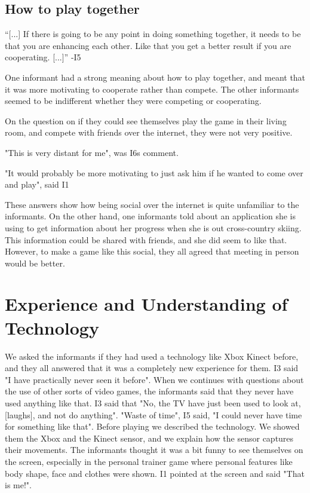 \subsection{How to play together}
“[...] If there is going to be any point in doing something together, it needs to be that you are enhancing each other. Like that you get a better result if you are cooperating. [...]” -I5

One informant had a strong meaning about how to play together, and meant that it was more motivating to cooperate rather than compete. The other informants seemed to be indifferent whether they were competing or cooperating.

On the question on if they could see themselves play the game in their living room, and compete with friends over the internet, they were not very positive.

"This is very distant for me", was I6s comment.

"It would probably be more motivating to just ask him if he wanted to come over and play", said I1

These answers show how being social over the internet is quite unfamiliar to the informants. On the other hand, one informants told about an application she is using to get information about her progress when she is out cross-country skiing. This information could be shared with friends, and she did seem to like that. However, to make a game like this social, they all agreed that meeting in person would be better.

\section{Experience and Understanding of Technology}
We asked the informants if they had used a technology like Xbox Kinect before, and they all answered that it was a completely new experience for them. I3 said "I have practically never seen it before". When we continues with questions about the use of other sorts of video games, the informants said that they never have used anything like that. I3 said that "No, the TV have just been used to look at, [laughs], and not do anything". "Waste of time", I5 said, "I could never have time for something like that".  Before playing we described the technology. We showed them the Xbox and the Kinect sensor, and we explain how the sensor captures their movements. The informants thought it was a bit funny to see themselves on the screen, especially in the personal trainer game where personal features like body shape, face and clothes were shown. I1 pointed at the screen and said "That is me!". 

